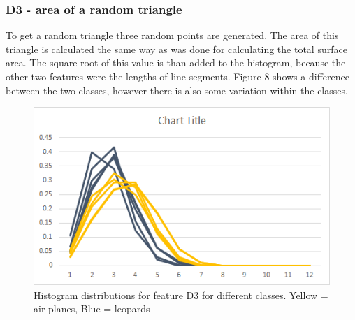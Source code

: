 \documentclass{bigdata}
\begin{document}
\subsubsection{D3 - area of a random triangle}
To get a random triangle three random points are generated. The area of this triangle is calculated the same way as was done for calculating the total surface area. The square root of this value is than added to the histogram, because the other two features were the lengths of line segments.
Figure 8 shows a difference between the two classes, however there is also some variation within the classes. 

\begin{figure}[h!]
    \includegraphics[width=\linewidth]{Pictures/Part3/D3.png}
    \caption{Histogram distributions for feature D3 for different classes. Yellow = air planes, Blue = leopards}
  \label{fig:eccentricity}
\end{figure}
\end{document}
